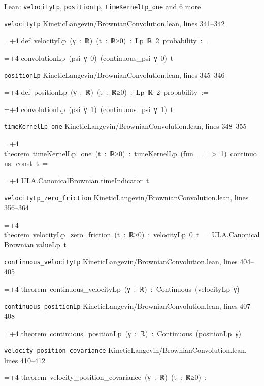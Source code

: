 \documentclass[11pt,a4paper]{article}
\newlength{\leancharwidth}
\newenvironment{leancode}{\par\smallskip\begingroup\ttfamily\footnotesize\raggedright
  \settowidth{\leancharwidth}{M}\setlength{\parskip}{0pt}\setlength{\parindent}{0pt}
  \frenchspacing}{\par\endgroup\smallskip}
\newcommand{\leanline}[2]{\hangindent=\dimexpr#1\leancharwidth+4\leancharwidth\relax
  \hangafter=1\noindent\hspace*{#1\leancharwidth}#2\par}
\newcommand{\leansource}[1]{\par{\footnotesize\color{leanmuted}#1}\par}
\begin{document}
\begin{leanbox}{Lean: \texttt{velocityLp}, \texttt{positionLp}, \texttt{timeKernelLp\_\allowbreak{}one} and 6 more}
\leansource{\texttt{velocityLp} \quad KineticLangevin/\allowbreak{}BrownianConvolution.lean, lines 341–342}
\begin{leancode}
\leanline{0}{def\ velocityLp\ (γ\ :\ ℝ)\ (t\ :\ ℝ≥0)\ :\ Lp\ ℝ\ 2\ probability\ :=}
\leanline{2}{convolutionLp\ (psi\ γ\ 0)\ (continuous\_psi\ γ\ 0)\ t}
\end{leancode}
\leansource{\texttt{positionLp} \quad KineticLangevin/\allowbreak{}BrownianConvolution.lean, lines 345–346}
\begin{leancode}
\leanline{0}{def\ positionLp\ (γ\ :\ ℝ)\ (t\ :\ ℝ≥0)\ :\ Lp\ ℝ\ 2\ probability\ :=}
\leanline{2}{convolutionLp\ (psi\ γ\ 1)\ (continuous\_psi\ γ\ 1)\ t}
\end{leancode}
\leansource{\texttt{timeKernelLp\_\allowbreak{}one} \quad KineticLangevin/\allowbreak{}BrownianConvolution.lean, lines 348–355}
\begin{leancode}
\leanline{0}{theorem\ timeKernelLp\_one\ (t\ :\ ℝ≥0)\ :\ timeKernelLp\ (fun\ \_\ =>\ 1)\ continuous\_const\ t\ =}
\leanline{4}{ULA.CanonicalBrownian.timeIndicator\ t}
\end{leancode}
\leansource{\texttt{velocityLp\_\allowbreak{}zero\_\allowbreak{}friction} \quad KineticLangevin/\allowbreak{}BrownianConvolution.lean, lines 356–364}
\begin{leancode}
\leanline{0}{theorem\ velocityLp\_zero\_friction\ (t\ :\ ℝ≥0)\ :\ velocityLp\ 0\ t\ =\ ULA.CanonicalBrownian.valueLp\ t}
\end{leancode}
\leansource{\texttt{continuous\_\allowbreak{}velocityLp} \quad KineticLangevin/\allowbreak{}BrownianConvolution.lean, lines 404–405}
\begin{leancode}
\leanline{0}{theorem\ continuous\_velocityLp\ (γ\ :\ ℝ)\ :\ Continuous\ (velocityLp\ γ)}
\end{leancode}
\leansource{\texttt{continuous\_\allowbreak{}positionLp} \quad KineticLangevin/\allowbreak{}BrownianConvolution.lean, lines 407–408}
\begin{leancode}
\leanline{0}{theorem\ continuous\_positionLp\ (γ\ :\ ℝ)\ :\ Continuous\ (positionLp\ γ)}
\end{leancode}
\leansource{\texttt{velocity\_\allowbreak{}position\_\allowbreak{}covariance} \quad KineticLangevin/\allowbreak{}BrownianConvolution.lean, lines 410–412}
\begin{leancode}
\leanline{0}{theorem\ velocity\_position\_covariance\ (γ\ :\ ℝ)\ (t\ :\ ℝ≥0)\ :}

\end{leancode}
\end{leanbox}
\end{document}
